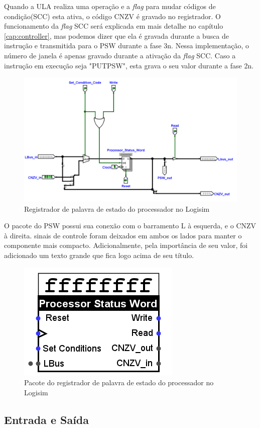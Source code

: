 \documentclass[
	article,			%
	11pt,				%
	oneside,			%
	a4paper,			%
	english,			%
	brazil,				%
	sumario=tradicional
	]{abntex2}
\begin{document}
Quando a ULA realiza uma operação e a \textit{flag} para mudar códigos de condição(SCC) esta ativa, o código CNZV é gravado no registrador. O funcionamento da \textit{flag} SCC será explicada em mais detalhe no capítulo \ref{cap:controller}, mas podemos dizer que ela é gravada durante a busca de instrução e transmitida para o PSW durante a fase 3n. Nessa implementação, o número de janela é apenas gravado durante a ativação da \textit{flag} SCC. Caso a instrução em execução seja "PUTPSW", esta grava o seu valor durante a fase 2n. 
\begin{figure}[H]
    \centering
    \includegraphics[width=0.75\linewidth]{Logisim/psw.png}
    \caption{Registrador de palavra de estado do processador no Logisim}
    \label{fig:psw}
\end{figure}
 O pacote do PSW possui sua conexão com o barramento L à esquerda, e o CNZV à direita. sinais de controle foram deixados em ambos os lados para manter o componente mais compacto. Adicionalmente, pela importância de seu valor, foi adicionado um texto grande que fica logo acima de seu título.
\begin{figure}[H]
    \centering
    \includegraphics[width=0.25\linewidth]{Logisim/pswPack.png}
    \caption{Pacote do registrador de palavra de estado do processador no Logisim}
    \label{fig:pswPack}
\end{figure}
\subsection{Entrada e Saída}
\end{document}
